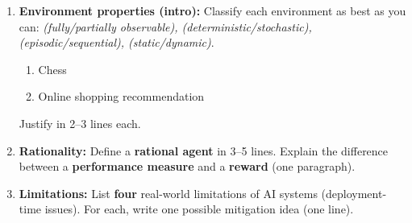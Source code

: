 \documentclass[11pt,a4paper]{article}
\begin{document}
\begin{enumerate}[label=E\arabic*., leftmargin=*]
  \item \textbf{Environment properties (intro):} Classify each environment as best as you can:
    \emph{(fully/partially observable), (deterministic/stochastic), (episodic/sequential), (static/dynamic)}.
    \begin{enumerate}[label=(\alph*), leftmargin=*]
      \item Chess
      \item Online shopping recommendation
    \end{enumerate}
    Justify in 2--3 lines each.

  \item \textbf{Rationality:} Define a \textbf{rational agent} in 3--5 lines.
    Explain the difference between a \textbf{performance measure} and a \textbf{reward} (one paragraph).

  \item \textbf{Limitations:} List \textbf{four} real-world limitations of AI systems (deployment-time issues).
    For each, write one possible mitigation idea (one line).
\end{enumerate}
\end{document}
